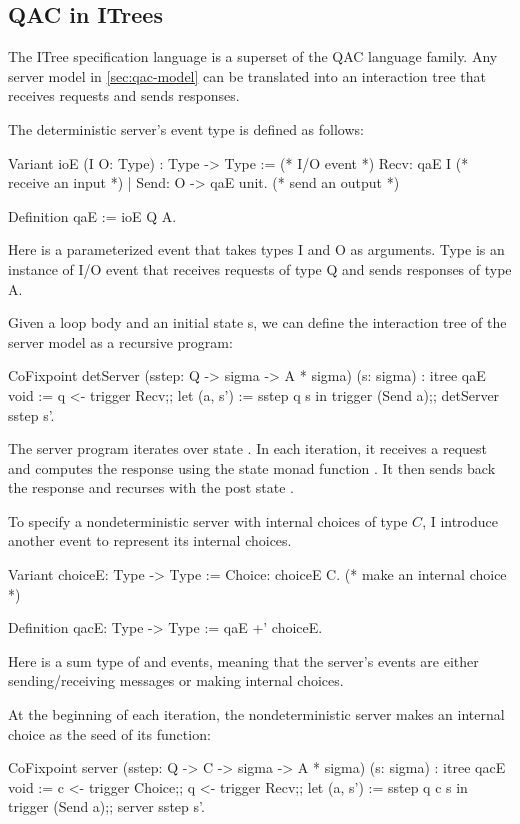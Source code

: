 \subsection{QAC in ITrees}
\label{sec:qac-itree}
The ITree specification language is a superset of the QAC language family.  Any
server model in \autoref{sec:qac-model} can be translated into an interaction
tree that receives requests and sends responses.

The deterministic server's event type is defined as follows:
\begin{coq}
  Variant ioE (I O: Type) : Type -> Type := (* I/O event *)
    Recv: qaE I                     (* receive an input  *)
  | Send: O -> qaE unit.            (* send    an output *)

  Definition qaE := ioE Q A.
\end{coq}
Here  is a parameterized event that takes types \ilc I and \ilc O as
arguments.  Type  is an instance of I/O event that receives requests of
type \ilc Q and sends responses of type \ilc A.

Given a loop body  and an initial state \ilc s, we can define the
interaction tree of the server model as a recursive program:
\begin{coq}
  CoFixpoint detServer (sstep: Q -> sigma -> A * sigma) (s: sigma) : itree qaE void :=
    q <- trigger Recv;;
    let (a, s') := sstep q s in
    trigger (Send a);;
    detServer sstep s'.
\end{coq}
The server program iterates over state .  In each iteration, it
receives a request  and computes the response  using the
state monad function .  It then sends back the response and recurses
with the post state .

To specify a nondeterministic server with internal choices of type $C$, I
introduce another event to represent its internal choices.
\begin{coq}
  Variant choiceE: Type -> Type :=
    Choice: choiceE C.    (* make an internal choice *)

  Definition qacE: Type -> Type := qaE +' choiceE.
\end{coq}
Here  is a sum type of  and  events, meaning
that the server's events are either sending/receiving messages or making
internal choices.

At the beginning of each iteration, the nondeterministic server makes an
internal choice  as the seed of its  function:
\begin{coq}
  CoFixpoint server (sstep: Q -> C -> sigma -> A * sigma) (s: sigma) : itree qacE void :=
    c <- trigger Choice;;
    q <- trigger Recv;;
    let (a, s') := sstep q c s in
    trigger (Send a);;
    server sstep s'.
\end{coq}


